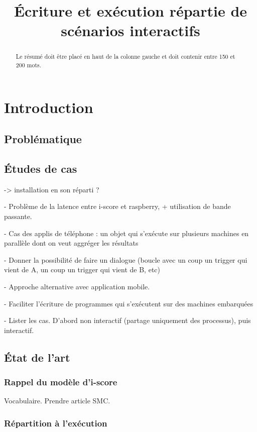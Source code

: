 \documentclass{article}
\title{Écriture et exécution répartie de scénarios interactifs}
\begin{document}
\maketitle
\begin{abstract}
Le résumé doit être placé en haut de la colonne gauche et doit contenir entre 150 et 200 mots.
\end{abstract}
\section{Introduction}
\subsection{Problématique}

\subsection{Études de cas}
-> installation en son réparti ?

- Problème de la latence entre i-score et raspberry, + utilisation de bande passante.

- Cas des applis de téléphone : un objet qui s'exécute sur plusieurs machines en parallèle dont on veut aggréger les résultats

- Donner la possibilité de faire un dialogue (boucle avec un coup un trigger qui vient de A, un coup un trigger qui vient de B, etc)

- Approche alternative avec application mobile.

- Faciliter l'écriture de programmes qui s'exécutent sur des machines embarquées

- Lister les cas. D'abord non interactif (partage uniquement des processus), puis interactif.

\subsection{État de l'art}
\subsubsection{Rappel du modèle d'i-score}
Vocabulaire. Prendre article SMC.
\subsubsection{Répartition à l'exécution}
\end{document}
